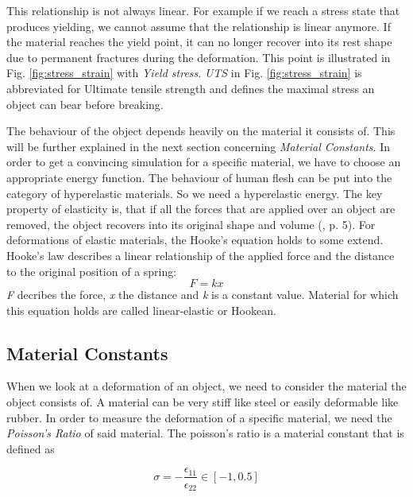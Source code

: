 This relationship is not always linear. For example if we reach a stress state that produces yielding, we cannot assume that the relationship is linear anymore. If the material reaches the yield point, it can no longer recover into its rest shape due to permanent fractures during the deformation. This point is illustrated in Fig. \ref{fig:stress_strain} with \textit{Yield stress}. \textit{UTS} in Fig. \ref{fig:stress_strain} is abbreviated for Ultimate tensile strength and defines the maximal stress an object can bear before breaking. 


The behaviour of the object depends heavily on the material it consists of. This will be further explained in the next section concerning \textit{Material Constants}. In order to get a convincing simulation for a specific material, we have to choose an appropriate energy function. The behaviour of human flesh can be put into the category of hyperelastic materials. So we need a hyperelastic energy. The key property of elasticity is, that if all the forces that are applied over an object are removed, the object recovers into its original shape and volume (\cite{KORSUNSKY20175}, p. 5). For deformations of elastic materials, the Hooke's equation holds to some extend. Hooke's law describes a linear relationship of the applied force and the distance to the original position of a spring:
\[
	F = kx
\]
\textit{F} decribes the force, \textit{x} the distance and \textit{k} is a constant value. Material for which this equation holds are called linear-elastic or Hookean.


\subsection{Material Constants}
When we look at a deformation of an object, we need to consider the material the object consists of. A material can be very stiff like steel or easily deformable like rubber. In order to measure the deformation of a specific material, we need the \textit{Poisson's Ratio} of said material. The poisson's ratio is a material constant that is defined as 

\begin{equation}\label{eq:poisson}
\sigma = - \frac{\epsilon_{11}}{\epsilon_{22}} \in [-1, 0.5]
\end{equation}

